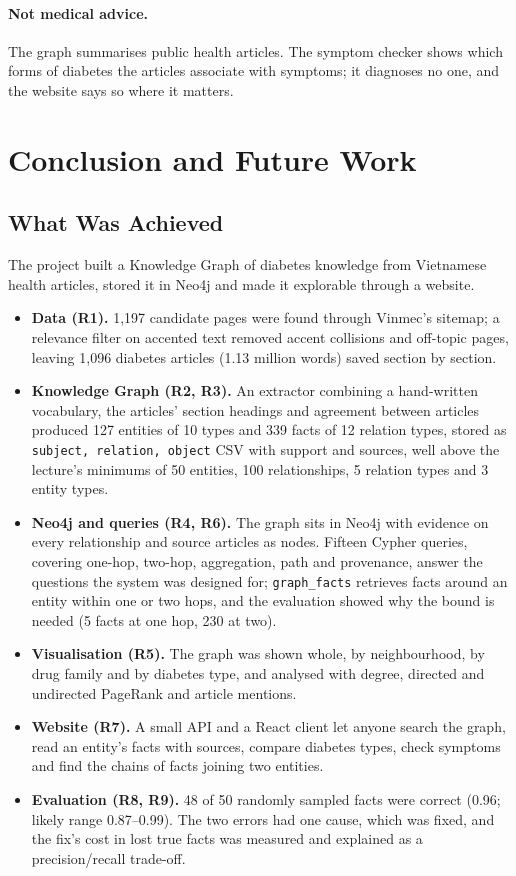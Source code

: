 \documentclass[11pt, a4paper]{article}
\newcommand{\code}[1]{\texttt{#1}}
\begin{document}
\paragraph{Not medical advice.} The graph summarises public health articles. The symptom checker shows which forms of diabetes the articles associate with symptoms; it diagnoses no one, and the website says so where it matters.

\section{Conclusion and Future Work}
\label{sec:conclusion}

\subsection{What Was Achieved}

The project built a Knowledge Graph of diabetes knowledge from Vietnamese health articles, stored it in Neo4j and made it explorable through a website.

\begin{itemize}
    \item \textbf{Data (R1).} 1,197 candidate pages were found through Vinmec's sitemap; a relevance filter on accented text removed accent collisions and off-topic pages, leaving 1,096 diabetes articles (1.13 million words) saved section by section.
    \item \textbf{Knowledge Graph (R2, R3).} An extractor combining a hand-written vocabulary, the articles' section headings and agreement between articles produced 127 entities of 10 types and 339 facts of 12 relation types, stored as \code{subject, relation, object} CSV with support and sources, well above the lecture's minimums of 50 entities, 100 relationships, 5 relation types and 3 entity types.
    \item \textbf{Neo4j and queries (R4, R6).} The graph sits in Neo4j with evidence on every relationship and source articles as nodes. Fifteen Cypher queries, covering one-hop, two-hop, aggregation, path and provenance, answer the questions the system was designed for; \code{graph\_facts} retrieves facts around an entity within one or two hops, and the evaluation showed why the bound is needed (5 facts at one hop, 230 at two).
    \item \textbf{Visualisation (R5).} The graph was shown whole, by neighbourhood, by drug family and by diabetes type, and analysed with degree, directed and undirected PageRank and article mentions.
    \item \textbf{Website (R7).} A small API and a React client let anyone search the graph, read an entity's facts with sources, compare diabetes types, check symptoms and find the chains of facts joining two entities.
    \item \textbf{Evaluation (R8, R9).} 48 of 50 randomly sampled facts were correct (0.96; likely range 0.87--0.99). The two errors had one cause, which was fixed, and the fix's cost in lost true facts was measured and explained as a precision/recall trade-off.
\end{itemize}
\end{document}
